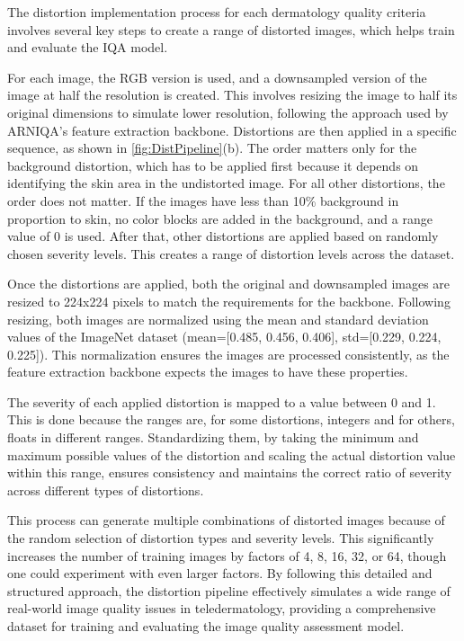The distortion implementation process for each dermatology quality criteria involves several key steps to create a range of distorted images, which helps train and evaluate the IQA model.
 \par
\vspace{\baselineskip}
\noindent
For each image, the RGB version is used, and a downsampled version of the image at half the resolution is created. This involves resizing the image to half its original dimensions to simulate lower resolution, following the approach used by ARNIQA’s \autocite{ARNIQA} feature extraction backbone. Distortions are then applied in a specific sequence, as shown in \autoref{fig:DistPipeline}(b). The order matters only for the background distortion, which has to be applied first because it depends on identifying the skin area in the undistorted image. For all other distortions, the order does not matter. If the images have less than 10\% background in proportion to skin, no color blocks are added in the background, and a range value of 0 is used. After that, other distortions are applied based on randomly chosen severity levels. This creates a range of distortion levels across the dataset. \par
\vspace{\baselineskip}
\noindent
Once the distortions are applied, both the original and downsampled images are resized to 224x224 pixels to match the requirements for the backbone. Following resizing, both images are normalized using the mean and standard deviation values of the ImageNet dataset (mean=[0.485, 0.456, 0.406], std=[0.229, 0.224, 0.225]). This normalization ensures the images are processed consistently, as the feature extraction backbone expects the images to have these properties. \par
\vspace{\baselineskip}
\noindent
The severity of each applied distortion is mapped to a value between 0 and 1. This is done because the ranges are, for some distortions, integers and for others, floats in different ranges. Standardizing them, by taking the minimum and maximum possible values of the distortion and scaling the actual distortion value within this range, ensures consistency and maintains the correct ratio of severity across different types of distortions. \par
\vspace{\baselineskip}
\noindent
This process can generate multiple combinations of distorted images because of the random selection of distortion types and severity levels. This significantly increases the number of training images by factors of 4, 8, 16, 32, or 64, though one could experiment with even larger factors. By following this detailed and structured approach, the distortion pipeline effectively simulates a wide range of real-world image quality issues in teledermatology, providing a comprehensive dataset for training and evaluating the image quality assessment model. \par
